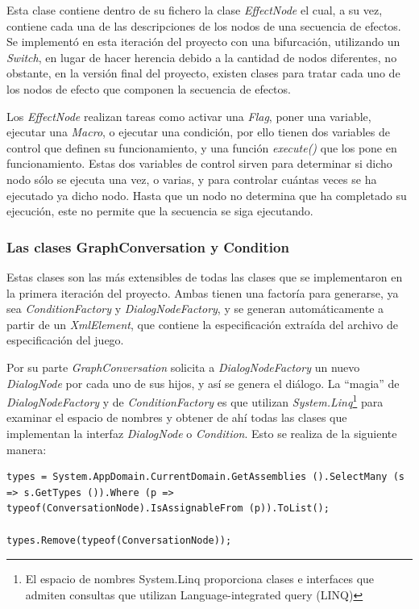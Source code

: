 Esta clase contiene dentro de su fichero la clase \textit{EffectNode} el cual, a su vez, contiene cada una de las descripciones de los nodos de una secuencia de efectos. Se implementó en esta iteración del proyecto con una bifurcación, utilizando un \textit{Switch}, en lugar de hacer herencia debido a la cantidad de nodos diferentes, no obstante, en la versión final del proyecto, existen clases para tratar cada uno de los nodos de efecto que componen la secuencia de efectos.

Los \textit{EffectNode} realizan tareas como activar una \textit{Flag}, poner una variable, ejecutar una \textit{Macro}, o ejecutar una condición, por ello tienen dos variables de control que definen su funcionamiento, y una función \textit{execute()} que los pone en funcionamiento. Estas dos variables de control sirven para determinar si dicho nodo sólo se ejecuta una vez, o varias, y para controlar cuántas veces se ha ejecutado ya dicho nodo. Hasta que un nodo no determina que ha completado su ejecución, este no permite que la secuencia se siga ejecutando.

\subsubsection{Las clases GraphConversation y Condition}

Estas clases son las más extensibles de todas las clases que se implementaron en la primera iteración del proyecto. Ambas tienen una factoría para generarse, ya sea \textit{ConditionFactory} y \textit{DialogNodeFactory}, y se generan automáticamente a partir de un \textit{XmlElement}, que contiene la especificación extraída del archivo de especificación del juego.

Por su parte \textit{GraphConversation} solicita a \textit{DialogNodeFactory} un nuevo \textit{DialogNode} por cada uno de sus hijos, y así se genera el diálogo. La “magia” de \textit{DialogNodeFactory} y de \textit{ConditionFactory} es que utilizan \textit{System.Linq}\footnote{El espacio de nombres System.Linq proporciona clases e interfaces que admiten consultas que utilizan Language-integrated query (LINQ)} para examinar el espacio de nombres y obtener de ahí todas las clases que implementan la interfaz \textit{DialogNode} o \textit{Condition}. Esto se realiza de la siguiente manera:
\begin{lstlisting}
types = System.AppDomain.CurrentDomain.GetAssemblies ().SelectMany (s => s.GetTypes ()).Where (p => typeof(ConversationNode).IsAssignableFrom (p)).ToList();

types.Remove(typeof(ConversationNode));
\end{lstlisting}


